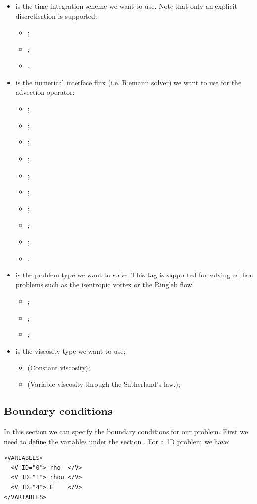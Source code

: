 \begin{itemize}
\item {} is the time-integration scheme we want to use. 
Note that only an explicit discretisation is supported:
\begin{itemize}
\item {};
\item {};
\item {}.
\end{itemize}
\item {} is the numerical interface flux (i.e. Riemann solver) 
we want to use for the advection operator:
\begin{itemize}
\item {};
\item {}; 
\item {}; 
\item {}; 
\item {}; 
\item {};
\item {};
\item {};
\item {};
\item {}.
\end{itemize}
\item {} is the problem type we want to solve. 
This tag is supported for solving ad hoc problems such as the 
isentropic vortex or the Ringleb flow.
\begin{itemize}
\item {};
\item {};
\item {};\\[0.2em]
\end{itemize}
\item {} is the viscosity type we want to use:
\begin{itemize}
\item {} (Constant viscosity);
\item {} (Variable viscosity through the Sutherland's law.);
\end{itemize}
\end{itemize}

\subsection*{Boundary conditions}
In this section we can specify the boundary conditions for our problem.
First we need to define the variables under the section .
For a 1D problem we have:
\begin{lstlisting}[style=XmlStyle]        
<VARIABLES>
  <V ID="0"> rho  </V>
  <V ID="1"> rhou </V>
  <V ID="4"> E    </V>
</VARIABLES>
\end{lstlisting}

